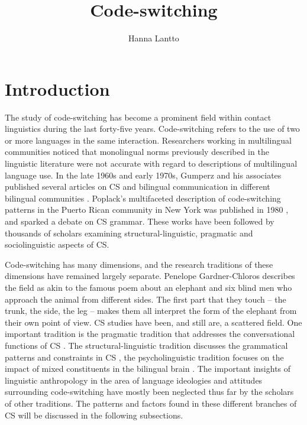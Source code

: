 \documentclass[output=paper]{langscibook}
\author{Hanna Lantto\affiliation{University of Turku}}
\title{Code-switching}
\begin{document}
\maketitle
\label{chap_codeswitching}

\section{Introduction} 

The study of code-switching has become a prominent field within contact linguistics during the last forty-five years. Code-switching refers to the use of two or more languages in the same interaction.  Researchers working in multilingual communities noticed that monolingual norms previously described in the linguistic literature were not accurate with regard to descriptions of multilingual language use. In the late 1960s and early 1970s, Gumperz and his associates published several articles on CS and bilingual communication in different bilingual communities \parencite{gumperz1964punjabi,gumperz1967linguistic,gumperz1971convergence,blom1972directions}. Poplack’s multifaceted description of code-switching patterns in the Puerto Rican community in New York was published in 1980 \parencite{poplack1980sometimes}, and sparked a debate on CS grammar. These works have been followed by thousands of scholars examining structural-linguistic, pragmatic and sociolinguistic aspects of CS. 

Code-switching has many dimensions, and the research traditions of these dimensions have remained largely separate. Penelope Gardner-Chloros \parencite{gardner2009code} describes the field as akin to the famous poem about an elephant and six blind men who approach the animal from different sides. The first part that they touch – the trunk, the side, the leg – makes them all interpret the form of the elephant from their own point of view. CS studies have been, and still are, a scattered field. One important tradition is the pragmatic tradition that addresses the conversational functions of CS \parencite{gumperz1982discourse,auer1998code}. The structural-linguistic tradition discusses the grammatical patterns and constraints in CS \parencite{poplack1980sometimes,myers1997duelling, muysken2000}, the psycholinguistic tradition focuses on the impact of mixed constituents in the bilingual brain \parencite{gullberg2009technique,couto2017chapter}. The important insights of linguistic anthropology in the area of language ideologies and attitudes surrounding code-switching  \parencite{woolard1998introduction, woolard2004codeswitching, jaffe2007discourses} have mostly been neglected thus far by the scholars of other traditions. The patterns and factors found in these different branches of CS will be discussed in the following subsections.
\end{document}
